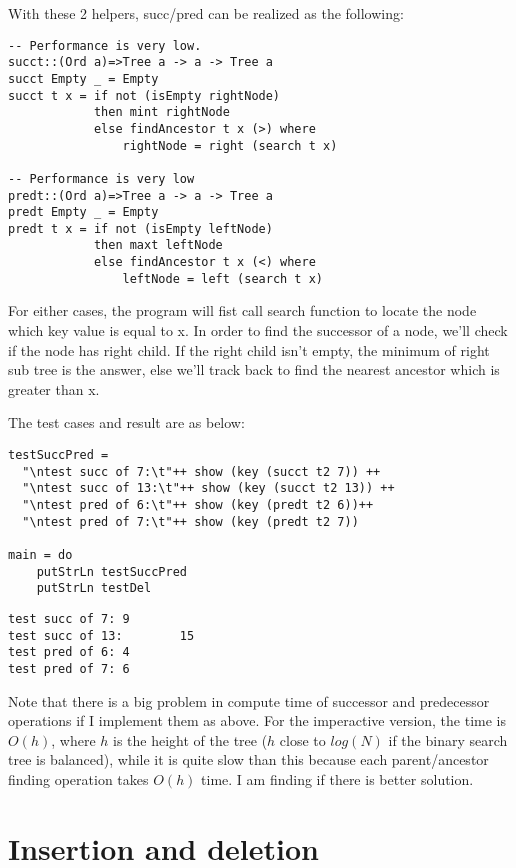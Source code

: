 \documentclass{article}
\begin{document}
With these 2 helpers, succ/pred can be realized as the following:
\begin{lstlisting}
-- Performance is very low.
succt::(Ord a)=>Tree a -> a -> Tree a
succt Empty _ = Empty
succt t x = if not (isEmpty rightNode)
            then mint rightNode
            else findAncestor t x (>) where
                rightNode = right (search t x)

-- Performance is very low
predt::(Ord a)=>Tree a -> a -> Tree a
predt Empty _ = Empty
predt t x = if not (isEmpty leftNode)
            then maxt leftNode
            else findAncestor t x (<) where
                leftNode = left (search t x)
\end{lstlisting}

For either cases, the program will fist call search function to locate the node
which key value is equal to x. In order to find the successor of a node, we'll 
check if the node has right child. If the right child isn't empty, the minimum 
of right sub tree is the answer, else we'll track back to find the nearest 
ancestor which is greater than x.

The test cases and result are as below:
\begin{lstlisting}
testSuccPred = 
  "\ntest succ of 7:\t"++ show (key (succt t2 7)) ++
  "\ntest succ of 13:\t"++ show (key (succt t2 13)) ++
  "\ntest pred of 6:\t"++ show (key (predt t2 6))++
  "\ntest pred of 7:\t"++ show (key (predt t2 7))

main = do
    putStrLn testSuccPred
    putStrLn testDel
\end{lstlisting}

\begin{verbatim}
test succ of 7: 9
test succ of 13:        15
test pred of 6: 4
test pred of 7: 6
\end{verbatim}

Note that there is a big problem in compute time of successor and predecessor 
operations if I implement them as above. For the imperactive version, the time
is $O(h)$, where $h$ is the height of the tree ($h$ close to $log(N)$ if the
binary search tree is balanced), while it is quite slow than this because each
parent/ancestor finding operation takes $O(h)$ time. I am finding if there is 
better solution.

\section{Insertion and deletion}
\end{document}
